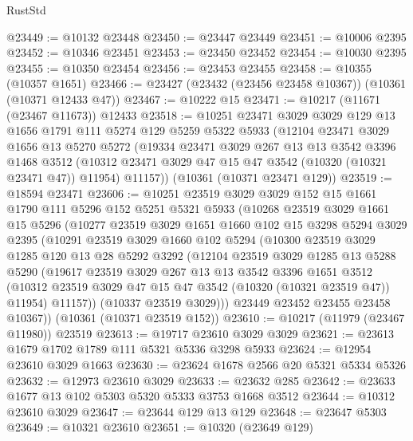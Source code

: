 \begin{lexlean}{RustStd}
\begin{coremodule}
@23449 := @10132 @23448
@23450 := @23447 @23449
@23451 := @10006 @2395
@23452 := @10346 @23451
@23453 := @23450 @23452
@23454 := @10030 @2395
@23455 := @10350 @23454
@23456 := @23453 @23455
@23458 := @10355 (@10357 @1651)
@23466 := @23427 (@23432 (@23456 @23458 @10367)) (@10361 (@10371 @12433 @47))
@23467 := @10222 @15
@23471 := @10217 (@11671 (@23467 @11673)) @12433
@23518 := @10251
    @23471
    @3029
    @3029
    @129
    @13
    @1656
    @1791
    @111
    @5274
    @129
    @5259
    @5322
    @5933
    (@12104
      @23471
      @3029
      @1656
      @13
      @5270
      @5272
      (@19334
        @23471
        @3029
        @267
        @13
        @13
        @3542
        @3396
        @1468
        @3512
        (@10312 @23471 @3029 @47 @15 @47 @3542 (@10320 (@10321 @23471 @47)) @11954)
        @11157))
    (@10361 (@10371 @23471 @129))
@23519 := @18594 @23471
@23606 := @10251
    @23519
    @3029
    @3029
    @152
    @15
    @1661
    @1790
    @111
    @5296
    @152
    @5251
    @5321
    @5933
    (@10268
      @23519
      @3029
      @1661
      @15
      @5296
      (@10277
        @23519
        @3029
        @1651
        @1660
        @102
        @15
        @3298
        @5294
        @3029
        @2395
        (@10291
          @23519
          @3029
          @1660
          @102
          @5294
          (@10300
            @23519
            @3029
            @1285
            @120
            @13
            @28
            @5292
            @3292
            (@12104
              @23519
              @3029
              @1285
              @13
              @5288
              @5290
              (@19617
                @23519
                @3029
                @267
                @13
                @13
                @3542
                @3396
                @1651
                @3512
                (@10312 @23519 @3029 @47 @15 @47 @3542 (@10320 (@10321 @23519 @47)) @11954)
                @11157))
            (@10337 @23519 @3029)))
        @23449
        @23452
        @23455
        @23458
        @10367))
    (@10361 (@10371 @23519 @152))
@23610 := @10217 (@11979 (@23467 @11980)) @23519
@23613 := @19717 @23610 @3029 @3029
@23621 := @23613 @1679 @1702 @1789 @111 @5321 @5336 @3298 @5933
@23624 := @12954 @23610 @3029 @1663
@23630 := @23624 @1678 @2566 @20 @5321 @5334 @5326
@23632 := @12973 @23610 @3029
@23633 := @23632 @285
@23642 := @23633 @1677 @13 @102 @5303 @5320 @5333 @3753 @1668 @3512
@23644 := @10312 @23610 @3029
@23647 := @23644 @129 @13 @129
@23648 := @23647 @5303
@23649 := @10321 @23610
@23651 := @10320 (@23649 @129)

\end{coremodule}
\end{lexlean}
